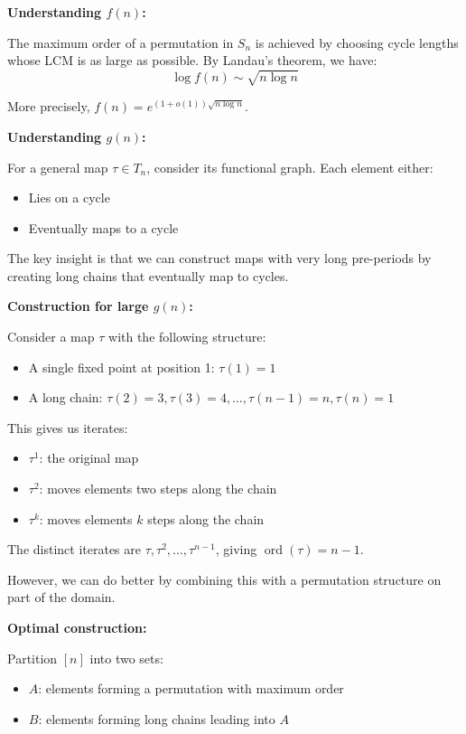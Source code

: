 \documentclass[12pt,a4paper]{article}
\theoremstyle{definition}
\begin{document}
    \textbf{Understanding $f(n)$:}

    The maximum order of a permutation in $S_n$ is achieved by choosing cycle lengths whose LCM is as large as possible. By Landau's theorem, we have:
    $$\log f(n) \sim \sqrt{n \log n}$$

    More precisely, $f(n) = e^{(1+o(1))\sqrt{n \log n}}$.

    \textbf{Understanding $g(n)$:}

    For a general map $\tau \in T_n$, consider its functional graph. Each element either:
    \begin{itemize}
        \item Lies on a cycle
        \item Eventually maps to a cycle
    \end{itemize}

    The key insight is that we can construct maps with very long pre-periods by creating long chains that eventually map to cycles.

    \textbf{Construction for large $g(n)$:}

    Consider a map $\tau$ with the following structure:
    \begin{itemize}
        \item A single fixed point at position 1: $\tau(1) = 1$
        \item A long chain: $\tau(2) = 3, \tau(3) = 4, \ldots, \tau(n-1) = n, \tau(n) = 1$
    \end{itemize}

    This gives us iterates:
    \begin{itemize}
        \item $\tau^1$: the original map
        \item $\tau^2$: moves elements two steps along the chain
        \item $\tau^k$: moves elements $k$ steps along the chain
    \end{itemize}

    The distinct iterates are $\tau, \tau^2, \ldots, \tau^{n-1}$, giving $\operatorname{ord}(\tau) = n-1$.

    However, we can do better by combining this with a permutation structure on part of the domain.

    \textbf{Optimal construction:}

    Partition $[n]$ into two sets:
    \begin{itemize}
        \item $A$: elements forming a permutation with maximum order
        \item $B$: elements forming long chains leading into $A$
    \end{itemize}
\end{document}
